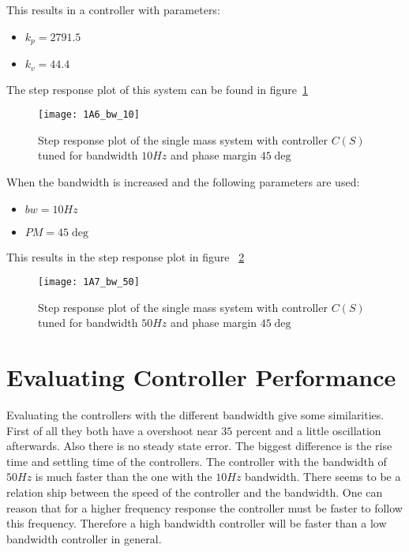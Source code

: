 \documentclass[report.tex]{subfiles}
\begin{document}
This results in a controller with parameters:
\begin{itemize}
\item{$k_p = 2791.5$}
\item{$k_v = 44.4$}
\end{itemize}
The step response plot of this system can be found in figure~\ref{fig:1A6_bw_10}
\begin{figure}
  \centering
\texttt{[image: 1A6\_bw\_10]}
\caption{Step response plot of the single mass system with controller $C(S)$ tuned for bandwidth $10 Hz$ and phase margin $45\deg$}
\label{fig:1A6_bw_10}
\end{figure}

When the bandwidth is increased and the following parameters are used: 
\begin{itemize}
\item{$bw = 10 Hz$}
\item{$PM = 45\deg$}
\end{itemize}
This results in the step response plot in figure ~\ref{fig:1A7_bw_50}
\begin{figure}
  \centering
\texttt{[image: 1A7\_bw\_50]}
\caption{Step response plot of the single mass system with controller $C(S)$ tuned for bandwidth $50 Hz$ and phase margin $45\deg$}
\label{fig:1A7_bw_50}
\end{figure}

\section{Evaluating Controller Performance}

Evaluating the controllers with the different bandwidth give some similarities. 
First of all they both have a overshoot near $35$ percent and a little oscillation afterwards. Also there is no steady state error. 
The biggest difference is the rise time and settling time of the controllers. The controller with the bandwidth of $50Hz$ is much faster than the one with the $10Hz$ bandwidth. There seems to be a relation ship between the speed of the controller and the bandwidth. One can reason that for a higher frequency response the controller must be faster to follow this frequency. Therefore a high bandwidth controller will be faster than a low bandwidth controller in general. 



\end{document}
